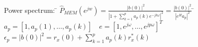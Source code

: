 \begin{tabbing}
Power spectrum:  	\=  $\hat{P}_{MEM}(e^{jw}) =  \frac{|b(0)|^2}{\left| 1 + \sum\limits_{k=1}^{p} a_p(k)e^{-jk\omega}\right|^2} = 				
						\frac{|b(0)|^2}{\left|e^H a_p\right|^2}$ 
						\hspace{1cm} \= $a_p=[1,a_p(1),\ldots, a_p(k)] \quad e=[1,e^{j\omega},\ldots, e^{jp\omega}]^T $ \\
\>						$\epsilon_p = |b(0)|^2 = r_x(0) + \sum\limits_{k=1}^p a_p(k) r_x^*(k)$ \\
\end{tabbing}


